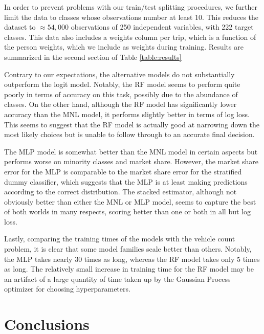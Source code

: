 \documentclass[numbered]{trbunofficial}
\begin{document}
In order to prevent problems with our train/test splitting procedures, we further limit the data to classes whose observations number at least 10.
 This reduces the dataset to $\approx 54,000$ observations of 250 independent variables, with 222 target classes.
 This data also includes a weights column per trip, which is a function of the person weights, which we include as weights during training.
 Results are summarized in the second section of Table \ref{table:results}

Contrary to our expectations, the alternative models do not substantially outperform the logit model.
 Notably, the RF model seems to perform quite poorly in terms of accuracy on this task, possibly due to the abundance of classes.
 On the other hand, although the RF model has significantly lower accuracy than the MNL model, it performs slightly better in terms of log loss.
 This seems to suggest that the RF model is actually good at narrowing down the most likely choices but is unable to follow through to an accurate final decision.

The MLP model is somewhat better than the MNL model in certain aspects but performs worse on minority classes and market share.
 However, the market share error for the MLP is comparable to the market share error for the stratified dummy classifier, which suggests that the MLP is at least making predictions according to the correct distribution. 
 The stacked estimator, although not obviously better than either the MNL or MLP model, seems to capture the best of both worlds in many respects, scoring better than one or both in all but log loss.

Lastly, comparing the training times of the models with the vehicle count problem, it is clear that some model families scale better than others.
 Notably, the MLP takes nearly 30 times as long, whereas the RF model takes only 5 times as long.
 The relatively small increase in training time for the RF model may be an artifact of a large quantity of time taken up by the Gaussian Process optimizer for choosing hyperparameters.

\section{Conclusions}\label{section:conclusions}
 
\end{document}

